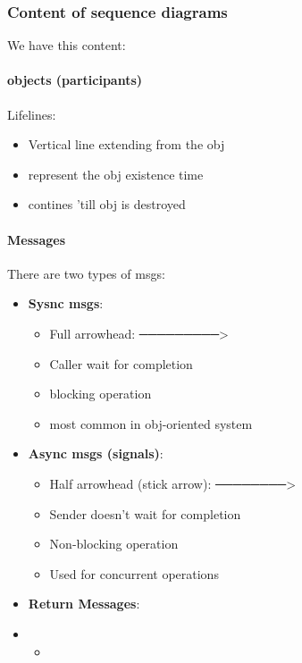\subsubsection{Content of sequence diagrams}
We have this content:
\paragraph{objects (participants)}

Lifelines:
\begin{itemize}
    \item Vertical line extending from the obj
    \item represent the obj existence time
    \item contines 'till obj is destroyed
\end{itemize}
\paragraph{Messages} There are two types of msgs:
\begin{itemize}
    \item \textbf{Sysnc msgs}:
    \begin{itemize}
        \item Full arrowhead: ─────────>
        \item Caller wait for completion
        \item blocking operation
        \item most common in obj-oriented system
    \end{itemize}
    \item \textbf{Async msgs (signals)}:
    \begin{itemize}
        \item Half arrowhead (stick arrow): ────────>
        \item Sender doesn't wait for completion
        \item Non-blocking operation
        \item Used for concurrent operations
    \end{itemize}
    \item \textbf{Return Messages}:
    \item \begin{itemize}
        \item 
    \end{itemize}
\end{itemize}
